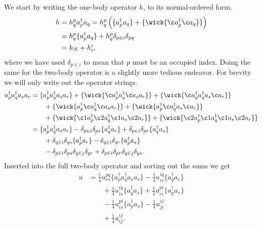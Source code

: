 \documentclass[
    a4paper, aps, twocolumn, floatfix, superscriptaddress,
    nofootinbib]{revtex4-1}
\newcommand{\1}{\mathds{1}}
\newcommand{\para}[1]{\left(#1\right)}
\newcommand{\acr}[1]{a_{#1}^{\dagger}}
\newcommand{\ade}[1]{a_{#1}}
\begin{document}
    We start by writing the one-body operator $h$, to its normal-ordered form.
    \begin{align}
        h &= h^p_q\acr{p}\ade{q}
        = h^p_q\para{
            \{\acr{p}\ade{q}\}
            + \{
                \wick{\c a_{p}^{\dagger} \c a_{q}}
            \}
        }
        \\
        &= h^p_q\{
            \acr{p}\ade{q}
        \}
        + h^p_q\delta_{p \in i}\delta_{pq}
        \\
        &= h_N + h^i_i,
    \end{align}
    where we have used $\delta_{p \in i}$ to mean that $p$ must be an occupied
    index. Doing the same for the two-body operator is a slightly more tedious
    endeavor. For brevity we will only write out the operator strings.
    \begin{align}
        \acr{p}\acr{q}\ade{s}\ade{r}
        &=
        \{\acr{p}\acr{q}\ade{s}\ade{r}\}
        + \{
            \wick{\c a_p^{\dagger} a_{q}^{\dagger} \c a_{s} a_{r}}
        \}
        + \{
            \wick{\c a_p^{\dagger} a_{q}^{\dagger} a_{s} \c a_{r}}
        \}
        \nonumber \\
        &\qquad
        + \{
            \wick{a_p^{\dagger} \c a_{q}^{\dagger} \c a_{s} a_{r}}
        \}
        + \{
            \wick{a_p^{\dagger} \c a_{q}^{\dagger} a_{s} \c a_{r}}
        \}
        \nonumber \\
        &\qquad
        + \{
            \wick{\c1 a_p^{\dagger} \c2 a_{q}^{\dagger} \c1 a_{s} \c2 a_{r}}
        \}
        + \{
            \wick{\c2 a_p^{\dagger} \c1 a_{q}^{\dagger} \c1 a_{s} \c2 a_{r}}
        \}
        \\
        &=
        \{\acr{p}\acr{q}\ade{s}\ade{r}\}
        - \delta_{p \in i}\delta_{ps}\{\acr{q}\ade{r}\}
        + \delta_{p \in i}\delta_{pr}\{\acr{q}\ade{s}\}
        \nonumber \\
        &\qquad
        + \delta_{q \in i}\delta_{qs}\{\acr{p}\ade{r}\}
        - \delta_{q \in i}\delta_{qr}\{\acr{p}\ade{s}\}
        \nonumber \\
        &\qquad
        - \delta_{p \in i}\delta_{ps}\delta_{q \in j}\delta_{qr}
        + \delta_{p \in i}\delta_{pr}\delta_{q \in j}\delta_{qs}.
    \end{align}
    Inserted into the full two-body operator and sorting out the sums we get
    \begin{align}
        u
        &=
        \frac{1}{4}u^{pq}_{rs}
        \{\acr{p}\acr{q}\ade{s}\ade{r}\}
        - \frac{1}{4}u^{iq}_{ri}\{\acr{q}\ade{r}\}
        \nonumber \\
        &\qquad
        + \frac{1}{4}u^{iq}_{is}\{\acr{q}\ade{s}\}
        + \frac{1}{4}u^{pi}_{ri}\{\acr{p}\ade{r}\}
        \nonumber \\
        &\qquad
        - \frac{1}{4}u^{pi}_{is}\{\acr{p}\ade{s}\}
        - \frac{1}{4}u^{ij}_{ji}
        \nonumber \\
        &\qquad
        + \frac{1}{4}u^{ij}_{ij}.
    \end{align}
\end{document}
